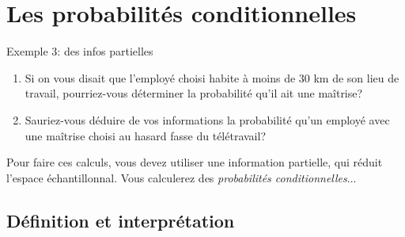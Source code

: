\documentclass{BeamerTemplate}
\begin{document}
\section[Prob. conditionnelles]{Les probabilités conditionnelles}
\begin{frame}[t]{Exemple 3: des infos partielles}
\begin{enumerate}
\item Si on vous disait que l'employé choisi habite à moins de 30 km de son lieu de travail, pourriez-vous déterminer la probabilité qu'il ait une maîtrise?

\vspace{1.3cm}

\item Sauriez-vous déduire de vos informations la probabilité qu'un employé avec une maîtrise choisi au hasard fasse du télétravail?

\vspace{1.3cm}
\end{enumerate}

Pour faire ces calculs, vous devez utiliser une information partielle, qui réduit l'espace échantillonnal. Vous calculerez des {\it probabilités conditionnelles}...

\end{frame}



\subsection{Définition et interprétation}
\end{document}
